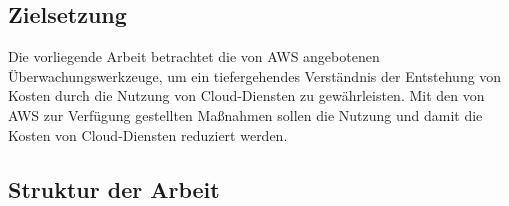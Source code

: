 \subsection{Zielsetzung}
Die vorliegende Arbeit betrachtet die von AWS angebotenen Überwachungswerkzeuge, um ein tiefergehendes Verständnis der Entstehung von Kosten durch die Nutzung von Cloud-Diensten zu gewährleisten. Mit den von AWS zur Verfügung gestellten Maßnahmen sollen die Nutzung und damit die Kosten von Cloud-Diensten reduziert werden.

\begin{comment}
\subsection*{Einschränkungen}
\addcontentsline{toc}{subsection}{Einschränkungen}

Der Schwerpunkt dieser Arbeit liegt auf EC2-Instanzen, da diese in der Regel den größten Anteil an der Rechnung ausmachen.
An zweiter Stelle stehen S3-Speichereinheiten, weil sie einen erheblichen Teil der Kosten darstellen.

{\cite{AMZ08,AMZ09}} 
\\
Diese Arbeit legt den Fokus auf die Optimierung der oben genannten Dienste.
Als Überwachungswerkzeuge für die Kosten werden die AWS CloudWatch, der AWS Cost-Explorer und der AWS Trusted Advisor untersucht. 
\end{comment}
\subsection{Struktur der Arbeit}

